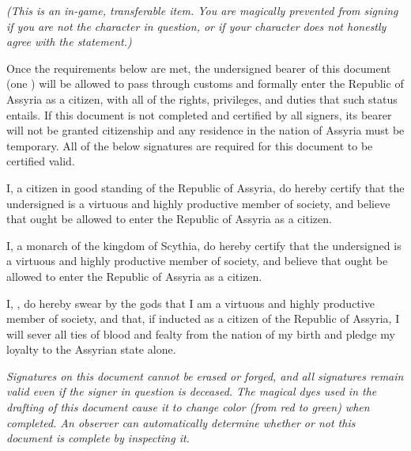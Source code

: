 \documentclass[white]{Kos}
\begin{document}
\name{\wAssyriaPapers{}}

\emph{(This is an in-game, transferable item. You are magically prevented from signing if you are not the character in question, or if your character does not honestly agree with the statement.)}

Once the requirements below are met, the undersigned bearer of this document (one \cWard{\MYname}) will be allowed to pass through customs and formally enter the Republic of Assyria as a citizen, with all of the rights, privileges, and duties that such status entails. If this document is not completed and certified by all signers, its bearer will not be granted citizenship and any residence in the nation of Assyria must be temporary. All of the below signatures are required for this document to be certified valid.

I, a citizen in good standing of the Republic of Assyria, do hereby certify that the undersigned \cWard{\MYname} is a virtuous and highly productive member of society, and believe that \cWard{\they} ought be allowed to enter the Republic of Assyria as a citizen.

\hrulefill

I, a monarch of the kingdom of Scythia, do hereby certify that the undersigned \cWard{\MYname} is a virtuous and highly productive member of society, and believe that \cWard{\they} ought be allowed to enter the Republic of Assyria as a citizen.

\hrulefill

I, \cWard{\MYname}, do hereby swear by the gods that I am a virtuous and highly productive member of society, and that, if inducted as a citizen of the Republic of Assyria, I will sever all ties of blood and fealty from the nation of my birth and pledge my loyalty to the Assyrian state alone.

\hrulefill

\cWard{\MYname}

\emph{Signatures on this document cannot be erased or forged, and all signatures remain valid even if the signer in question is deceased. The magical dyes used in the drafting of this document cause it to change color (from red to green) when completed. An observer can automatically determine whether or not this document is complete by inspecting it.}
\end{document}
